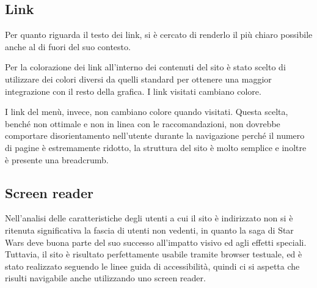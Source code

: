 \subsection{Link}
Per quanto riguarda il testo dei link, si è cercato di renderlo il più chiaro possibile anche al di fuori del suo contesto.

Per la colorazione dei link all'interno dei contenuti del sito è stato scelto di utilizzare dei colori diversi da quelli standard per ottenere una maggior integrazione con il resto della grafica. I link visitati cambiano colore.

I link del menù, invece, non cambiano colore quando visitati. Questa scelta, benché non ottimale e non in linea con le raccomandazioni, non dovrebbe comportare disorientamento nell'utente durante la navigazione perché il numero di pagine è estremamente ridotto, la struttura del sito è molto semplice e inoltre è presente una breadcrumb.

\subsection{Screen reader}
Nell'analisi delle caratteristiche degli utenti a cui il sito è indirizzato non si è ritenuta significativa la fascia di utenti non vedenti, in quanto la saga di Star Wars deve buona parte del suo successo all'impatto visivo ed agli effetti speciali. \newline
Tuttavia, il sito è risultato perfettamente usabile tramite browser testuale, ed è stato realizzato seguendo le linee guida di accessibilità, quindi ci si aspetta che risulti navigabile anche utilizzando uno screen reader.
